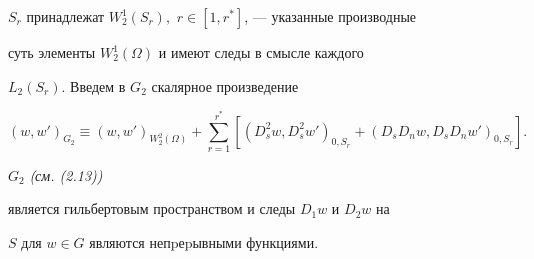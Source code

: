 $S_r$ принадлежат $W_2^1(S_r),$ $r\in[1,r^*]$, --- указанные производные


суть элементы $W_2^1(\Omega)$ и имеют следы в смысле каждого


$L_2(S_r).$ Введем в $G_2$ скалярное произведение





\begin{equation}


(w,w')_{G_2}\equiv


(w,w')_{W_2^2 (\Omega)}+


\sum_{r=1}^{r^*}[(D^2_sw,D^2_sw')_{0,S_r}+


(D_sD_nw,D_sD_nw')_{0,S_r}].


\end{equation}





\begin{thmm} $G_2$ {\em (см. (2.13))}


является гильбертовым пространством и следы $D_1w$ и $D_2w$ на


$S$ для $w\in G$ являются непpеpывными функциями.


\end{thmm}





